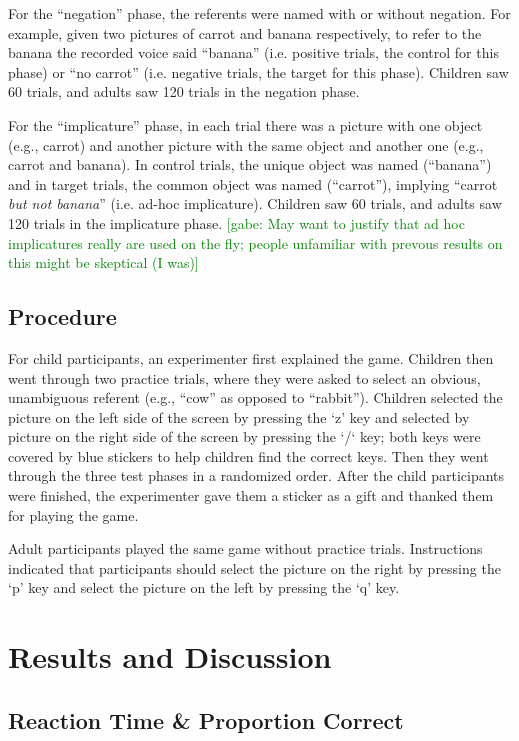 \documentclass[10pt,letterpaper]{article}
\newcommand{\gabe}[1]{\textcolor{Green}{[gabe: #1]}}
\begin{document}
For the ``negation'' phase, the referents were named with or without negation. For example, given two pictures of carrot and banana respectively, to refer to the banana the recorded voice said ``banana'' (i.e. positive trials, the control for this phase) or ``no carrot'' (i.e. negative trials, the target for this phase). Children saw 60 trials, and adults saw 120 trials in the negation phase. 

For the ``implicature'' phase, in each trial there was a picture with one object (e.g., carrot) and another picture with the same object and another one (e.g., carrot and banana). In control trials, the unique object was named (``banana'') and in target trials, the common object was named (``carrot''), implying ``carrot \emph{but not banana}'' (i.e. ad-hoc implicature). Children saw 60 trials, and adults saw 120 trials in the implicature phase.  \gabe{May want to justify that ad hoc implicatures really are used on the fly; people unfamiliar with prevous results on this might be skeptical (I was)}

\subsection{Procedure}

For child participants, an experimenter first explained the game.  Children then went through two practice trials, where they were asked to select an obvious, unambiguous referent (e.g., ``cow'' as opposed to ``rabbit'').  Children selected the picture on the left side of the screen by pressing the `z' key and selected by picture on the right side of the screen by pressing the `/` key; both keys were covered by blue stickers to help children find the correct keys. Then they went through the three test phases in a randomized order.  After the child participants were finished, the experimenter gave them a sticker as a gift and thanked them for playing the game.

Adult participants played the same game without practice trials.  Instructions indicated that participants should select the picture on the right by pressing the `p' key and select the picture on the left by pressing the `q' key.  

\section{Results and Discussion}

\subsection{Reaction Time \& Proportion Correct}
\end{document}
